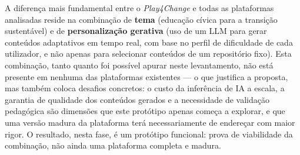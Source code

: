 A diferença mais fundamental entre o \emph{Play4Change} e todas as plataformas analisadas reside na combinação de \textbf{tema} (educação cívica para a transição sustentável) e de \textbf{personalização gerativa} (uso de um LLM para gerar conteúdos adaptativos em tempo real, com base no perfil de dificuldade de cada utilizador, e não apenas para selecionar conteúdos de um repositório fixo). Esta combinação, tanto quanto foi possível apurar neste levantamento, não está presente em nenhuma das plataformas existentes --- o que justifica a proposta, mas também coloca desafios concretos: o custo da inferência de IA a escala, a garantia de qualidade dos conteúdos gerados e a necessidade de validação pedagógica são dimensões que este protótipo apenas começa a explorar, e que uma versão madura da plataforma terá necessariamente de endereçar com maior rigor. O resultado, nesta fase, é um protótipo funcional: prova de viabilidade da combinação, não ainda uma plataforma completa e madura.
